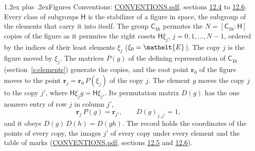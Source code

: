 \documentclass[10pt,a4paper]{article}
\makeatletter
\renewcommand\section{\@startsection{section}{1}{\z@}{-3ex plus -1ex minus -.2ex}%
  {1.2ex plus .2ex}{\normalfont\large\sffamily\bfseries\color{parttitle}}}
\numberwithin{equation}{section}
\newcommand{\eltfont}[1]{{\let\sigma\eltsigma\mathelt{#1}}}
\newcommand{\grp}[1]{\mathsf{#1}}
\newcommand{\cls}[1]{\eltfont{#1}}
\newcommand{\pointr}{\mathbf{r}}
\makeatother
\begin{document}
\section{Figures}\label{s:permutation}
Conventions: \href{../../CONVENTIONS.pdf}{CONVENTIONS.pdf}, sections \href{../../CONVENTIONS.pdf\#conv.12.4}{12.4} to \href{../../CONVENTIONS.pdf\#conv.12.6}{12.6}.
Every class of subgroups $\grp{H}$ is the stabilizer of a figure in space, the subgroup of the elements that carry it into itself. \label{n:local.orbit.size}\label{n:element.coset.least}\label{n:index.coset}The group $\grp{C_{1h}}$ permutes the $N = [\grp{C_{1h}} : \grp{H}]$ copies of the figure as it permutes the right cosets $\grp{H}\xi_j$, $j = 0, 1, \dots, N - 1$, ordered by the indices of their least elements $\xi_j$ ($\xi_0 = \cls{E}$). The copy $j$ is the figure moved by $\xi_j$. The matrices $P(g)$ of the defining representation of $\grp{C_{1h}}$ (section~\ref{s:elements}) generate the copies, and the root point $\pointr_0$ of the figure moves to the point $\pointr_j = \pointr_0\, P(\xi_j)$ of the copy $j$. \label{n:local.coset.image}The element $g$ moves the copy $j$ to the copy $j'$, where $\grp{H}\xi_j g = \grp{H}\xi_{j'}$. \label{n:local.matrix.permutation}Its permutation matrix $D(g)$ has the one nonzero entry of row $j$ in column $j'$,
\begin{equation}\label{e:perm.matrix}\pointr_j\, P(g) = \pointr_{j'}, \qquad D(g)_{j,j'} = 1,\end{equation}
and it obeys $D(g)\, D(h) = D(gh)$. The record holds the coordinates of the points of every copy, the images $j'$ of every copy under every element and the table of marks (\href{../../CONVENTIONS.pdf}{CONVENTIONS.pdf}, sections \href{../../CONVENTIONS.pdf\#conv.12.5}{12.5} and \href{../../CONVENTIONS.pdf\#conv.12.6}{12.6}).
\end{document}
